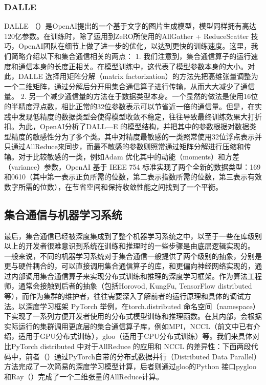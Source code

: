\documentclass[letterpaper,10pt,english]{sphinxmanual}
\begin{document}
\subsubsection{DALL\sphinxhyphen{}E}
\label{\detokenize{chapter_distributed_training/collective:dall-e}}
\sphinxAtStartPar
DALL\sphinxhyphen{}E
（）是OpenAI提出的一个基于文字的图片生成模型，模型同样拥有高达120亿参数。在训练时，除了运用到ZeRO所使用的AllGather
+ ReduceScatter
技巧，OpenAI团队在细节上做了进一步的优化，以达到更快的训练速度。这里，我们简略介绍以下和集合通信相关的两点：
1.
我们注意到，集合通信算子的运行速度和通信本身的长度正相关。在模型训练中，这代表了模型参数本身的大小。对此，DALL\sphinxhyphen{}E
选择用矩阵分解（matrix
factorization）的方法先把高维张量调整为一个二维矩阵，通过分解后分开用集合通信算子进行传输，从而大大减少了通信量。
2.
另一个减少通信量的方法在于数据类型本身。一个显然的做法是使用16位的半精度浮点数，相比正常的32位参数表示可以节省近一倍的通信量。但是，在实践中发现低精度的数据类型会使得模型收敛不稳定，往往导致最终训练效果大打折扣。为此，OpenAI分析了DALL—E
的模型结构，并把其中的参数根据对数据类型精度的敏感性分为了多个类。其中对精度最敏感的一类照常使用32位浮点表示并只通过AllReduce来同步，而最不敏感的参数则照常通过矩阵分解进行压缩和传输。对于比较敏感的一类，例如Adam
优化其中的动能（moments）和方差（variance）参数，OpenAI 基于 IEEE 754
标准实现了两个全新的数据类型：1\sphinxhyphen{}6\sphinxhyphen{}9和0\sphinxhyphen{}6\sphinxhyphen{}10（其中第一表示正负所需的位数，第二表示指数所需的位数，第三表示有效数字所需的位数），在节省空间和保持收敛性能之间找到了一个平衡。


\subsection{集合通信与机器学习系统}
\label{\detokenize{chapter_distributed_training/collective:id16}}
\sphinxAtStartPar
最后，集合通信已经被深度集成到了整个机器学习系统之中，以至于一些在库级别以上的开发者很难意识到系统在训练和推理时的一些步骤是由底层逻辑实现的。
一般来说，不同的机器学习系统对于集合通信一般提供了两个级别的抽象，分别是更与硬件耦合的，可以直接调用集合通信算子的库，和更偏向神经网络实现的，通过内部调用集合通信算子来实现分布式训练和推理的深度学习框架。作为算法工程师，通常会接触到后者的抽象（包括Horovod,
KungFu, TensorFlow
distributed等），而作为集群的维护者，往往需要深入了解前者的运行原理和具体的调试方法。以深度学习框架
PyTorch 举例，在torch.distributed
命名空间（namespace）下实现了一系列方便开发者使用的分布式模型训练和推理函数。在其内部，会根据实际运行的集群调用更底层的集合通信算子库，例如MPI，NCCL（前文中已有介绍，适用于GPU分布式训练），gloo（适用于CPU分布式训练）等。我们来具体对比PyTorch
distributed 中对于AllReduce 的应用和 NCCL
的差异性：下面两段代码中，前者（）通过PyTorch自带的分布式数据并行（Distributed
Data
Parallel）方法完成了一次简易的深度学习模型计算，后者则通过gloo的Python
接口pygloo和Ray（）完成了一个二维张量的AllReduce计算。
\end{document}
